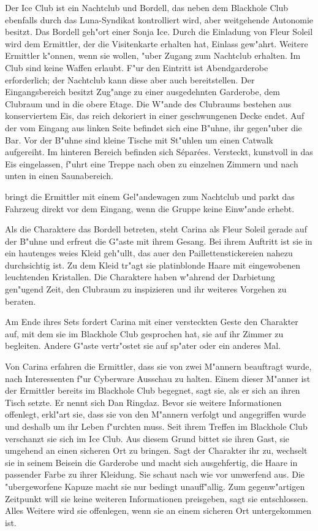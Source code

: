 
Der Ice Club ist ein Nachtclub und Bordell, das neben dem Blackhole Club ebenfalls durch das Luna-Syndikat kontrolliert wird, aber weitgehende Autonomie besitzt. Das Bordell geh"ort einer Sonja Ice. Durch die Einladung von Fleur Soleil wird dem Ermittler, der die Visitenkarte erhalten hat, Einlass gew"ahrt. Weitere Ermittler k"onnen, wenn sie wollen, "uber \xl{} Zugang zum Nachtclub erhalten. Im Club sind keine Waffen erlaubt. F"ur den Eintritt ist Abendgarderobe erforderlich; der Nachtclub kann diese aber auch bereitstellen. Der Eingangsbereich besitzt Zug"ange zu einer ausgedehnten Garderobe, dem Clubraum und in die obere Etage. Die W"ande des Clubraums bestehen aus konserviertem Eis, das reich dekoriert in einer geschwungenen Decke endet. Auf der vom Eingang aus linken Seite befindet sich eine B"uhne, ihr gegen"uber die Bar. Vor der B"uhne sind kleine Tische mit St"uhlen um einen Catwalk aufgereiht. Im hinteren Bereich befinden sich S\'epar\'ees. Versteckt, kunstvoll in das Eis eingelassen, f"uhrt eine Treppe nach oben zu einzelnen Zimmern und nach unten in einen Saunabereich.

\xl{} bringt die Ermittler mit einem Gel"andewagen zum Nachtclub und parkt das Fahrzeug direkt vor dem Eingang, wenn die Gruppe keine Einw"ande erhebt.

Als die Charaktere das Bordell betreten, steht Carina als Fleur Soleil gerade auf der B"uhne und erfreut die G"aste mit ihrem Gesang. Bei ihrem Auftritt ist sie in ein hautenges wei\3es Kleid geh"ullt, das au\3er den Paillettenstickereien nahezu durchsichtig ist. Zu dem Kleid tr"agt sie platinblonde Haare mit eingewobenen leuchtenden Kristallen. Die Charaktere haben w"ahrend der Darbietung gen"ugend Zeit, den Clubraum zu inspizieren und ihr weiteres Vorgehen zu beraten.

Am Ende ihres Sets fordert Carina mit einer versteckten Geste den Charakter auf, mit dem sie im Blackhole Club gesprochen hat, sie auf ihr Zimmer zu begleiten. Andere G"aste vertr"ostet sie auf sp"ater oder ein anderes Mal.

Von Carina erfahren die Ermittler, dass sie von zwei M"annern beauftragt wurde, nach Interessenten f"ur Cyberware Ausschau zu halten. Einem dieser M"anner ist der Ermittler bereits im Blackhole Club begegnet, sagt sie, als er sich an ihren Tisch setzte. Er nennt sich Dan Ringdaz. Bevor sie weitere Informationen offenlegt, erkl"art sie, dass sie von den M"annern verfolgt und angegriffen wurde und deshalb um ihr Leben f"urchten muss. Seit ihrem Treffen im Blackhole Club verschanzt sie sich im Ice Club. Aus diesem Grund bittet sie ihren Gast, sie umgehend an einen sicheren Ort zu bringen. Sagt der Charakter ihr zu, wechselt sie in seinem Beisein die Garderobe und macht sich ausgehfertig, die Haare in passender Farbe zu ihrer Kleidung. Sie schaut nach wie vor umwerfend aus. Die "ubergeworfene Kapuze macht sie nur bedingt unauff"allig. Zum gegenw"artigen Zeitpunkt will sie keine weiteren Informationen preisgeben, sagt sie entschlossen. Alles Weitere wird sie offenlegen, wenn sie an einem sicheren Ort untergekommen ist.

